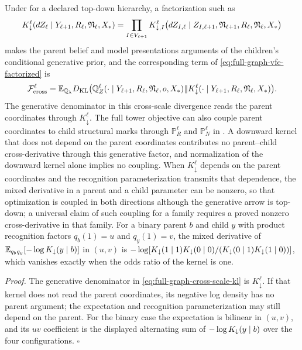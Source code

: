 Under  for a declared top-down hierarchy, a
factorization such as
\begin{equation}
K^\ell_\downarrow(dZ_\ell\mid Y_{\ell+1},R_\ell,\mathfrak N_\ell,X_*)
=\prod_{I\in V_{\ell+1}}K^\ell_{\downarrow,I}\bigl(dZ_{I,\ell}\mid Z_{I,\ell+1},\mathfrak N_{\ell+1},R_\ell,\mathfrak N_\ell,X_*\bigr)
\label{eq:full-graph-downward-kernel}
\end{equation}
makes the parent belief and model presentations arguments of the children's
conditional generative prior, and the corresponding term of
\eqref{eq:full-graph-vfe-factorized} is
\begin{equation}
\mathcal F^\ell_{\mathrm{cross}}
=\mathbb E_{\mathbb Q_\lambda}
D_{\mathrm{KL}}\bigl(\mathbb Q^\ell_Z(\cdot\mid Y_{\ell+1},R_\ell,\mathfrak N_\ell,o,X_*)\Vert
K^\ell_\downarrow(\cdot\mid Y_{\ell+1},R_\ell,\mathfrak N_\ell,X_*)\bigr).
\label{eq:full-graph-cross-scale-kl}
\end{equation}
The generative denominator in this cross-scale divergence reads the parent coordinates through
$K^\ell_\downarrow$. The full tower objective can also couple parent coordinates to child structural
marks through $\mathbb P^\ell_R$ and $\mathbb P^\ell_N$ in .
A downward kernel that does not depend on the parent coordinates
contributes no parent--child cross-derivative through this generative factor, and
normalization of the downward kernel alone implies no coupling. When
$K^\ell_\downarrow$ depends on the parent coordinates and the recognition
parameterization transmits that dependence, the mixed derivative in a parent and a
child parameter can be nonzero, so that optimization is coupled in both directions
although the generative arrow is top-down; a universal claim of such coupling for a
family requires a proved nonzero cross-derivative in that family. For a binary parent
$b$ and child $y$ with product recognition factors $q_b(1)=u$ and $q_y(1)=v$, the
mixed derivative of $\mathbb E_{q_bq_y}[-\log K_\downarrow(y\mid b)]$ in $(u,v)$ is
$-\log[K_\downarrow(1\mid1)K_\downarrow(0\mid0)/(K_\downarrow(0\mid1)K_\downarrow(1\mid0))]$,
which vanishes exactly when the odds ratio of the kernel is one.

\noindent\emph{Proof.}
The generative denominator in \eqref{eq:full-graph-cross-scale-kl} is $K^\ell_\downarrow$.
If that kernel does not read the parent coordinates, its negative log density has no parent
argument; the expectation and recognition parameterization may still depend on the parent. For the binary case the expectation is bilinear in $(u,v)$, and its $uv$
coefficient is the displayed alternating sum of $-\log K_\downarrow(y\mid b)$ over
the four configurations. $\square$

